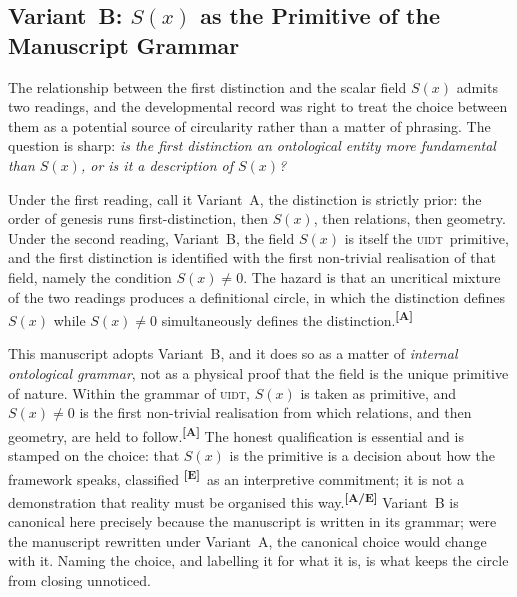 \documentclass[12pt,a4paper,twoside]{article}
\theoremstyle{plain}
\theoremstyle{definition}
\theoremstyle{remark}
\newcommand{\UIDT}{\textsc{uidt}}
\newcommand{\catmark}[1]{\textsuperscript{\textsf{\textbf{[#1]}}}}
\begin{document}
\subsection{Variant~B: \texorpdfstring{$S(x)$}{S(x)} as the Primitive of the Manuscript Grammar}
\label{subsec:variant-b}

The relationship between the first distinction and the scalar field $S(x)$ admits two readings, and the developmental record was right to treat the choice between them as a potential source of circularity rather than a matter of phrasing. The question is sharp: \emph{is the first distinction an ontological entity more fundamental than $S(x)$, or is it a description of $S(x)$?}

Under the first reading, call it Variant~A, the distinction is strictly prior: the order of genesis runs first-distinction, then $S(x)$, then relations, then geometry. Under the second reading, Variant~B, the field $S(x)$ is itself the \UIDT\ primitive, and the first distinction is identified with the first non-trivial realisation of that field, namely the condition $S(x)\neq 0$. The hazard is that an uncritical mixture of the two readings produces a definitional circle, in which the distinction defines $S(x)$ while $S(x)\neq 0$ simultaneously defines the distinction.\catmark{A}

This manuscript adopts Variant~B, and it does so as a matter of \emph{internal ontological grammar}, not as a physical proof that the field is the unique primitive of nature. Within the grammar of \UIDT, $S(x)$ is taken as primitive, and $S(x)\neq 0$ is the first non-trivial realisation from which relations, and then geometry, are held to follow.\catmark{A} The honest qualification is essential and is stamped on the choice: that $S(x)$ is the primitive is a decision about how the framework speaks, classified \catmark{E}\ as an interpretive commitment; it is not a demonstration that reality must be organised this way.\catmark{A/E} Variant~B is canonical here precisely because the manuscript is written in its grammar; were the manuscript rewritten under Variant~A, the canonical choice would change with it. Naming the choice, and labelling it for what it is, is what keeps the circle from closing unnoticed.
\end{document}
